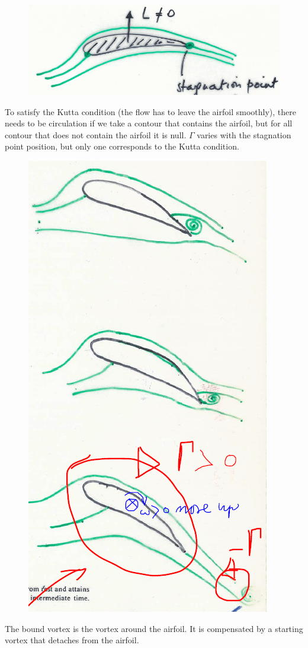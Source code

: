 \documentclass[british,french,11pt, a4paper, openany]{article}
\begin{document}
\begin{figure}
	\vspace{-5mm}
	\includegraphics[scale=0.25]{ch1/4}
	\label{fig1}
\end{figure}
To satisfy the Kutta condition (the flow has to leave the airfoil smoothly), there needs to be circulation if we take a contour that contains the airfoil, but for all contour that does not contain the airfoil it is null.  $\Gamma$ varies with the stagnation point position, but only one corresponds to the Kutta condition. \\

\begin{figure}
	\vspace{-5mm}
	\includegraphics[scale=0.25]{ch1/5}
\end{figure}
The bound vortex is the vortex around the airfoil. It is compensated by a starting vortex that detaches from the airfoil.
\end{document}

